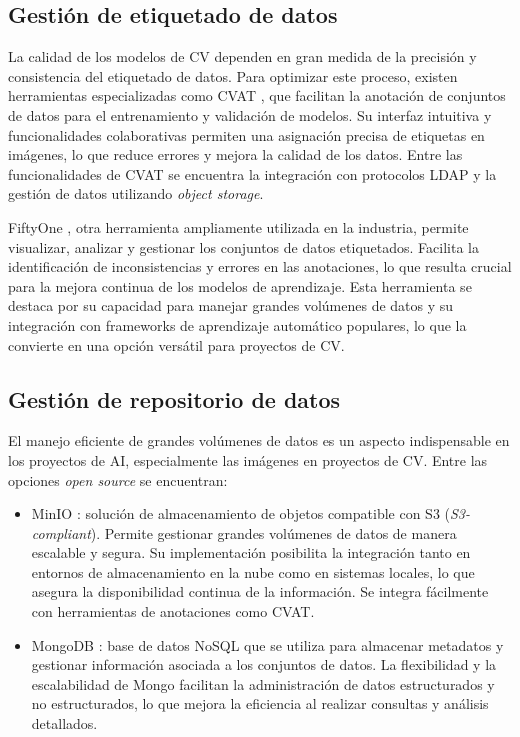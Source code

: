 \subsection{Gestión de etiquetado de datos}

La calidad de los modelos de CV dependen en gran medida de la precisión y consistencia del etiquetado de datos. Para optimizar este proceso, existen herramientas especializadas como CVAT \citep{sekachev_opencvcvat_2020}, que facilitan la anotación de conjuntos de datos para el entrenamiento y validación de modelos. Su interfaz intuitiva y funcionalidades colaborativas permiten una asignación precisa de etiquetas en imágenes, lo que reduce errores y mejora la calidad de los datos. Entre las funcionalidades de CVAT se encuentra la integración con protocolos LDAP y la gestión de datos utilizando \textit{object storage}.

FiftyOne \citep{moore_fiftyone_2020}, otra herramienta ampliamente utilizada en la industria, permite visualizar, analizar y gestionar los conjuntos de datos etiquetados. Facilita la identificación de inconsistencias y errores en las anotaciones, lo que resulta crucial para la mejora continua de los modelos de aprendizaje. Esta herramienta se destaca por su capacidad para manejar grandes volúmenes de datos y su integración con frameworks de aprendizaje automático populares, lo que la convierte en una opción versátil para proyectos de CV.

\subsection{Gestión de repositorio de datos}
\label{sec:gestionRepoDatos}

El manejo eficiente de grandes volúmenes de datos es un aspecto indispensable en los proyectos de AI, especialmente las imágenes en proyectos de CV. Entre las opciones \textit{open source} se encuentran:

\begin{itemize}
	\item MinIO \citep{minio_inc_minio_nodate}: solución de almacenamiento de objetos compatible con S3 \citep{wikipedia_amazon_2024} (\textit{S3-compliant}). Permite gestionar grandes volúmenes de datos de manera escalable y segura. Su implementación posibilita la integración tanto en entornos de almacenamiento en la nube como en sistemas locales, lo que asegura la disponibilidad continua de la información. Se integra fácilmente con herramientas de anotaciones como CVAT.
	\item MongoDB \citep{mongodb_inc_mongodb_nodate}: base de datos NoSQL que se utiliza para almacenar metadatos y gestionar información asociada a los conjuntos de datos. La flexibilidad y la escalabilidad de Mongo facilitan la administración de datos estructurados y no estructurados, lo que mejora la eficiencia al realizar consultas y análisis detallados.
\end{itemize}

